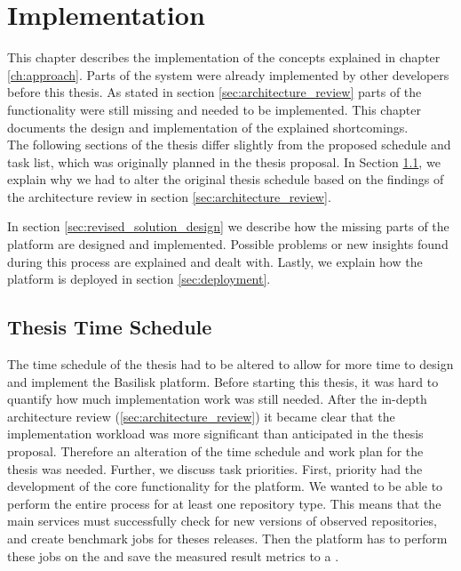 \chapter{Implementation}
\label{ch:implementation}
This chapter describes the implementation of the concepts explained in chapter \ref{ch:approach}.
Parts of the system were already implemented by other developers before this thesis.
As stated in section \ref{sec:architecture_review} parts of the functionality were still missing and needed to be implemented.
This chapter documents the design and implementation of the explained shortcomings.
\\

The following sections of the thesis differ slightly from the proposed schedule and task list, which was originally planned in the thesis proposal.
In Section \ref{sec:time_schedule}, we explain why we had to alter the original thesis schedule based on the findings of the architecture review in section \ref{sec:architecture_review}.

In section \ref{sec:revised_solution_design} we describe how the missing parts of the platform are designed and implemented.
Possible problems or new insights found during this process are explained and dealt with.
Lastly, we explain how the platform is deployed in section \ref{sec:deployment}.



\section{Thesis Time Schedule}
\label{sec:time_schedule}
The time schedule of the thesis had to be altered to allow for more time to design and implement the Basilisk platform.
Before starting this thesis, it was hard to quantify how much implementation work was still needed.
After the in-depth architecture review (\ref{sec:architecture_review}) it became clear that the implementation workload was more significant than anticipated in the thesis proposal.
Therefore an alteration of the time schedule and work plan for the thesis was needed.
Further, we discuss task priorities.
First, priority had the development of the core functionality for the platform.
We wanted to be able to perform the entire process for at least one repository type.
This means that the main services must successfully check for new versions of observed repositories, and create benchmark jobs for theses releases. 
Then the platform has to perform these jobs on the \tsp{} and save the measured result metrics to a \ts{}.

